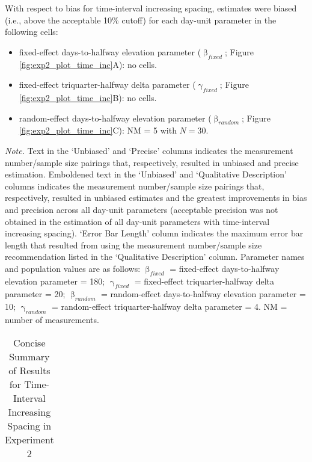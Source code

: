\documentclass[
12pt, %
twoside,
english]{guelphthesis}
\begin{document}
With respect to bias for time-interval increasing spacing, estimates were biased (i.e., above the acceptable 10\% cutoff) for each day-unit parameter in the following cells:
\begin{itemize}
\tightlist
\item
  fixed-effect days-to-halfway elevation parameter (\(\upbeta_{fixed}\); Figure \ref{fig:exp2_plot_time_inc}A): no cells.
\item
  fixed-effect triquarter-halfway delta parameter (\(\upgamma_{fixed}\); Figure \ref{fig:exp2_plot_time_inc}B): no cells.
\item
  random-effect days-to-halfway elevation parameter (\(\upbeta_{random}\); Figure \ref{fig:exp2_plot_time_inc}C): NM = 5 with \(N = 30\).
\end{itemize}
\begin{landscape}
\begin{ThreePartTable}
\begin{TableNotes}
\item \textit{Note. }Text in the `Unbiased' and `Precise' columns indicates the measurement number/sample size pairings that, respectively, resulted in unbiased and precise estimation. Emboldened text in the `Unbiased' and `Qualitative Description' columns indicates the measurement number/sample size pairings that, respectively, resulted in unbiased estimates and the greatest improvements in bias and precision across all day-unit parameters (acceptable precision was not obtained in the estimation of all day-unit parameters with time-interval increasing spacing). `Error Bar Length' column indicates the maximum error bar length that resulted from using the measurement number/sample size recommendation listed in the `Qualitative Description' column. Parameter names and population values are as follows: $\upbeta_{fixed}$ = fixed-effect days-to-halfway elevation parameter = 180; $\upgamma_{fixed}$ = fixed-effect triquarter-halfway delta parameter = 20; $\upbeta_{random}$ = random-effect days-to-halfway elevation parameter = 10; $\upgamma_{random}$ = random-effect triquarter-halfway delta parameter = 4. NM = number of measurements.
\end{TableNotes}
\begin{longtable}[l]{>{\raggedright\arraybackslash}p{3cm}>{\raggedright\arraybackslash}p{5cm}>{\raggedright\arraybackslash}p{5cm}>{\raggedright\arraybackslash}p{6.5cm}>{\centering\arraybackslash}p{3cm}}
\caption{\label{tab:summary-table-time-inc-exp2}Concise Summary of Results for Time-Interval Increasing Spacing in Experiment 2}\\

\end{longtable}
\end{ThreePartTable}
\end{landscape}
\end{document}

